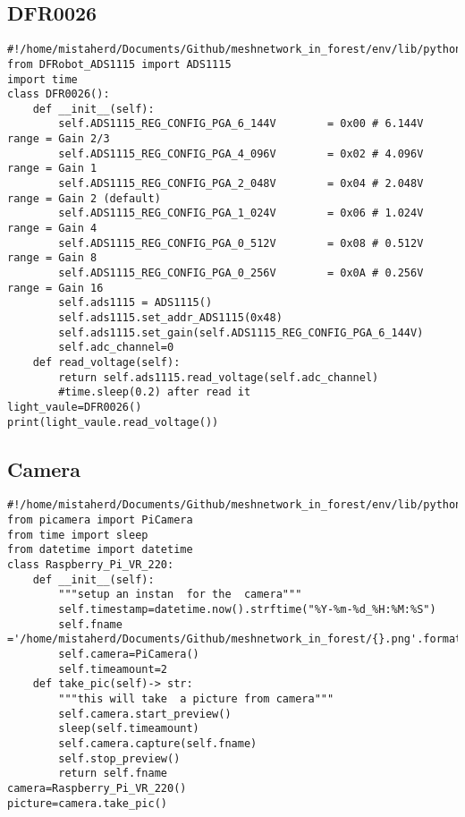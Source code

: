 \newpage
\subsection{DFR0026}
\begin{lstlisting}[style=mystyle,caption={Code for  DFR00026}]
#!/home/mistaherd/Documents/Github/meshnetwork_in_forest/env/lib/python3.11
from DFRobot_ADS1115 import ADS1115
import time
class DFR0026():
    def __init__(self):
        self.ADS1115_REG_CONFIG_PGA_6_144V        = 0x00 # 6.144V range = Gain 2/3
        self.ADS1115_REG_CONFIG_PGA_4_096V        = 0x02 # 4.096V range = Gain 1
        self.ADS1115_REG_CONFIG_PGA_2_048V        = 0x04 # 2.048V range = Gain 2 (default)
        self.ADS1115_REG_CONFIG_PGA_1_024V        = 0x06 # 1.024V range = Gain 4
        self.ADS1115_REG_CONFIG_PGA_0_512V        = 0x08 # 0.512V range = Gain 8
        self.ADS1115_REG_CONFIG_PGA_0_256V        = 0x0A # 0.256V range = Gain 16
        self.ads1115 = ADS1115()
        self.ads1115.set_addr_ADS1115(0x48)
        self.ads1115.set_gain(self.ADS1115_REG_CONFIG_PGA_6_144V)
        self.adc_channel=0
    def read_voltage(self):
        return self.ads1115.read_voltage(self.adc_channel)
        #time.sleep(0.2) after read it
light_vaule=DFR0026()
print(light_vaule.read_voltage())  

\end{lstlisting}
\newpage
\subsection{Camera}
\begin{lstlisting}[style=mystyle,caption={Code for Camera}]
#!/home/mistaherd/Documents/Github/meshnetwork_in_forest/env/lib/python3.11
from picamera import PiCamera
from time import sleep
from datetime import datetime
class Raspberry_Pi_VR_220:
    def __init__(self):
        """setup an instan  for the  camera"""
        self.timestamp=datetime.now().strftime("%Y-%m-%d_%H:%M:%S")
        self.fname ='/home/mistaherd/Documents/Github/meshnetwork_in_forest/{}.png'.format(self.timestamp)
        self.camera=PiCamera()
        self.timeamount=2
    def take_pic(self)-> str:
        """this will take  a picture from camera"""
        self.camera.start_preview()
        sleep(self.timeamount)
        self.camera.capture(self.fname)
        self.stop_preview()
        return self.fname
camera=Raspberry_Pi_VR_220()
picture=camera.take_pic()
\end{lstlisting}
\newpage 
